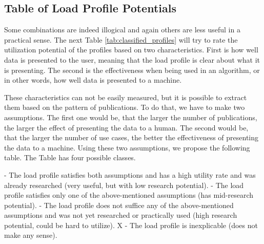 \subsection{Table of Load Profile Potentials} \label{subsec:potential}

Some combinations are indeed illogical and again others are less useful in a practical sense.
The next Table \ref{tab:classified_profiles} will try to rate the utilization potential of the profiles based on two characteristics. 
First is how well data is presented to the user,
meaning that the load profile is clear about what it is presenting.
The second is the effectiveness when being used in an algorithm, or in other words, how well data is presented to a machine. 

These characteristics can not be easily measured,
but it is possible to extract them based on the pattern of publications.
To do that, we have to make two assumptions.
The first one would be, that the larger the number of publications, the larger the effect of presenting the data to a human.
The second would be, that the larger the number of use cases, the better the effectiveness of presenting the data to a machine.
Using these two assumptions, we propose the following table. 
The Table has four possible classes. 

\begin{outline} 
 - The load profile satisfies both assumptions and has a high utility rate and was already researched (very useful, but with low research potential). 
 - The load profile satisfies only one of the above-mentioned assumptions (has mid-research potential).
 - The load profile does not suffice any of the above-mentioned assumptions and was not yet researched or practically used (high research potential, could be hard to utilize).
\1 X - The load profile is inexplicable (does not make any sense).
\end{outline}

